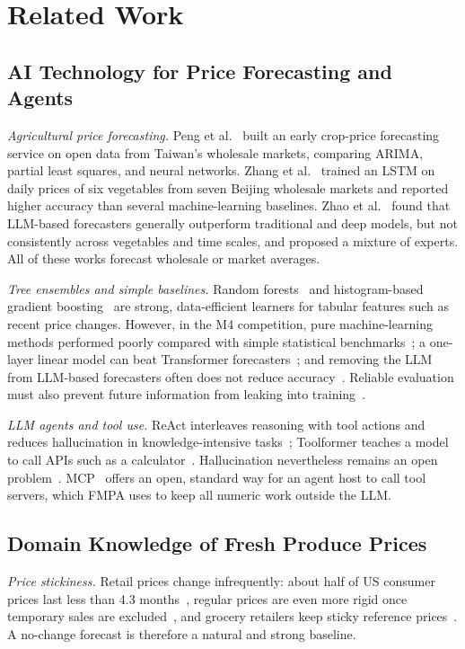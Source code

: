 \section{Related Work}\label{sec:related}

\subsection{AI Technology for Price Forecasting and Agents}
\textit{Agricultural price forecasting.} Peng et
al.~\cite{peng2015developing} built an early crop-price forecasting service on
open data from Taiwan's wholesale markets, comparing ARIMA, partial least
squares, and neural networks. Zhang et al.~\cite{zhang2024short} trained an
LSTM on daily prices of six vegetables from seven Beijing wholesale markets and
reported higher accuracy than several machine-learning baselines. Zhao et
al.~\cite{zhao2025vegetable} found that LLM-based forecasters generally
outperform traditional and deep models, but not consistently across vegetables
and time scales, and proposed a mixture of experts. All of these works forecast
wholesale or market averages.

\textit{Tree ensembles and simple baselines.} Random
forests~\cite{breiman2001random} and histogram-based gradient
boosting~\cite{ke2017lightgbm} are strong, data-efficient learners for tabular
features such as recent price changes. However, in the M4 competition, pure
machine-learning methods performed poorly compared with simple statistical
benchmarks~\cite{makridakis2020m4}; a one-layer linear model can beat
Transformer forecasters~\cite{zeng2023transformers}; and removing the LLM from
LLM-based forecasters often does not reduce accuracy~\cite{tan2024language}.
Reliable evaluation must also prevent future information from leaking into
training~\cite{kaufman2012leakage}.

\textit{LLM agents and tool use.} ReAct interleaves reasoning with tool actions
and reduces hallucination in knowledge-intensive tasks~\cite{yao2023react};
Toolformer teaches a model to call APIs such as a
calculator~\cite{schick2023toolformer}. Hallucination nevertheless remains an
open problem~\cite{huang2025survey}. MCP~\cite{anthropic2024mcp} offers an
open, standard way for an agent host to call tool servers, which FMPA uses to
keep all numeric work outside the LLM.

\subsection{Domain Knowledge of Fresh Produce Prices}
\textit{Price stickiness.} Retail prices change infrequently: about half of US
consumer prices last less than 4.3 months~\cite{bils2004some}, regular prices
are even more rigid once temporary sales are excluded~\cite{nakamura2008five},
and grocery retailers keep sticky reference prices~\cite{eichenbaum2011reference}.
A no-change forecast is therefore a natural and strong baseline.

